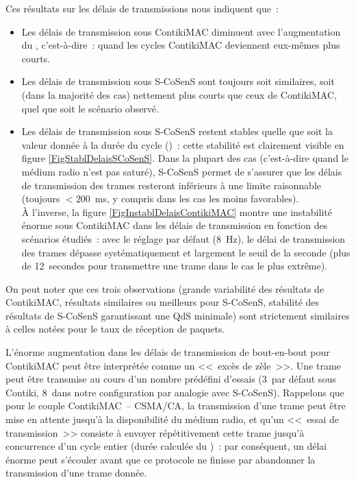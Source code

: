 \newpage

Ces résultats sur les délais de transmissions nous indiquent que~:

\begin{itemize}

\item Les délais de transmission sous ContikiMAC diminuent avec
l'augmentation du , c'est-à-dire~: quand 
les cycles ContikiMAC deviennent eux-mêmes plus courts.

\item Les délais de transmission sous S-CoSenS sont toujours soit
similaires, soit (dans la majorité des cas) nettement plus courts
que ceux de ContikiMAC, quel que soit le scénario observé.

\item Les délais de transmission sous S-CoSenS restent stables
quelle que soit la valeur donnée à la durée du cycle ()~:
cette stabilité est clairement visible en figure
\vref{FigStablDelaisSCoSenS}. Dans la plupart des cas (c'est-à-dire
quand le médium radio n'est pas saturé), S-CoSenS permet de s'assurer
que les délais de transmission des trames resteront inférieurs à
une limite raisonnable (toujours $< 200$~ms, y compris dans les cas
les moins favorables).\\
À l'inverse, la figure \vref{FigInstablDelaisContikiMAC} montre
une instabilité énorme sous ContikiMAC dans les délais de transmission
en fonction des scénarios étudiés~: avec le réglage par défaut (8~Hz),
le délai de transmission des trames dépasse systématiquement et
largement le seuil de la seconde (plus de 12~secondes pour
transmettre une trame dans le cas le plus extrême).

\end{itemize}

On peut noter que ces trois observations (grande variabilité des résultats
de ContikiMAC, résultats similaires ou meilleurs pour S-CoSenS, stabilité
des résultats de S-CoSenS garantissant une QdS minimale) sont strictement
similaires à celles notées pour le taux de réception de paquets.

\bigskip

L'énorme augmentation dans les délais de transmission de bout-en-bout
pour ContikiMAC peut être interprétée comme un <<~excès de zèle~>>.
Une trame peut être transmise au cours d'un nombre prédéfini d'essais
(3~par défaut sous Contiki, 8~dans notre configuration par analogie
avec S-CoSenS). Rappelons que pour le couple ContikiMAC~-- CSMA/CA,
la transmission d'une trame peut être mise en attente jusqu'à la
disponibilité du médium radio, et qu'un <<~essai de transmission~>>
consiste à envoyer répétitivement cette trame jusqu'à concurrence
d'un cycle entier (durée calculée du )~:
par conséquent, un délai énorme peut s'écouler avant que ce protocole
ne finisse par abandonner la transmission d'une trame donnée.

